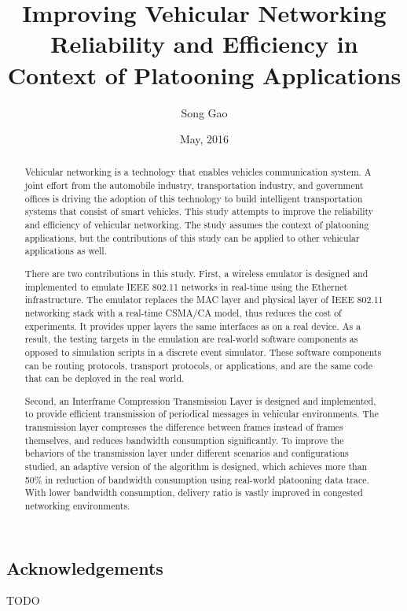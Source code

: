 \documentclass[12pt]{report}
\title{Improving Vehicular Networking Reliability and Efficiency in Context of Platooning Applications}
\author{Song Gao}
\date{May, 2016} %
\begin{document}
\begin{romanpages}      %

\TitlePage

\chapter*{Acknowledgements}
%

TODO

\begin{abstract} 
  Vehicular networking is a technology that enables vehicles communication system. A joint effort from the automobile industry, transportation industry, and government offices is driving the adoption of this technology to build intelligent transportation systems that consist of smart vehicles. This study attempts to improve the reliability and efficiency of vehicular networking. The study assumes the context of platooning applications, but the contributions of this study can be applied to other vehicular applications as well.

  There are two contributions in this study. First, a wireless emulator is designed and implemented to emulate IEEE 802.11 networks in real-time using the Ethernet infrastructure. The emulator replaces the MAC layer and physical layer of IEEE 802.11 networking stack with a real-time CSMA/CA model, thus reduces the cost of experiments. It provides upper layers the same interfaces as on a real device. As a result, the testing targets in the emulation are real-world software components as opposed to simulation scripts in a discrete event simulator. These software components can be routing protocols, transport protocols, or applications, and are the same code that can be deployed in the real world.

  Second, an Interframe Compression Transmission Layer is designed and implemented, to provide efficient transmission of periodical messages in vehicular environments. The transmission layer compresses the difference between frames instead of frames themselves, and reduces bandwidth consumption significantly. To improve the behaviors of the transmission layer under different scenarios and configurations studied, an adaptive version of the algorithm is designed, which achieves more than 50\% in reduction of bandwidth consumption using real-world platooning data trace. With lower bandwidth consumption, delivery ratio is vastly improved in congested networking environments.
\end{abstract}

\tableofcontents
\listoffigures
\listoftables

\printnomenclature[1.0in] %
\end{romanpages}        %
\end{document}
